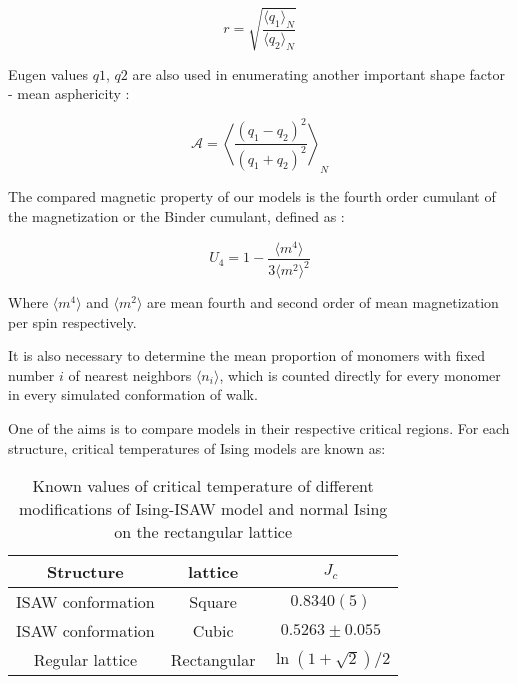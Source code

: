 \begin{equation}
    r = \sqrt{\frac{\langle q_{1}\rangle_{N}}{\langle q_{2} \rangle_{N}}}
\end{equation}

Eugen values $q1$, $q2$ are also used in enumerating another important shape factor - mean asphericity \cite{Caracciolo2011}:

\begin{equation}
\label{eq:Asphericity}
    \mathcal{A} = \left\langle \frac{(q_{1} - q_{2})^{2}}{(q_{1} + q_{2})^{2}} \right\rangle_{N}
\end{equation}

The compared magnetic property of our models is the fourth order cumulant of the magnetization or the Binder cumulant, defined as \cite{Binder1981_Ising}:

\begin{equation}
\label{eq:Cumulant}
U_{4} = 1 - \frac{\langle m^{4} \rangle}{3 \langle m^{2} \rangle^{2}}
\end{equation}

Where $\langle m^{4} \rangle$ and $\langle m^{2} \rangle$ are mean fourth and second order of mean magnetization per spin respectively.

It is also necessary to determine the mean proportion of monomers with fixed number $i$ of nearest neighbors $\langle n_{i} \rangle$, which is counted directly for every monomer in every simulated conformation of walk.

One of the aims is to compare models in their respective critical regions. For each structure, critical temperatures of Ising models are known as:

\begin{table}[h]
    \centering
    \begin{tabular}{|c|c|c|}
        \hline
        Structure & lattice & $J_{c}$ \\ \hline
        ISAW conformation & Square & $0.8340(5)$\cite{faizullina2021critical} \\ \hline
        ISAW conformation & Cubic & $0.5263 \pm 0.055$\cite{Foster2021}\\ \hline
        Regular lattice & Rectangular & $\ln{(1 + \sqrt{2}) / 2}$\cite{Onsager}\\ \hline
    \end{tabular}
    \label{tab:Ising_T_c}
    \medskip
    \caption{Known values of critical temperature of different modifications of Ising-ISAW model and normal Ising on the rectangular lattice}
\end{table}

